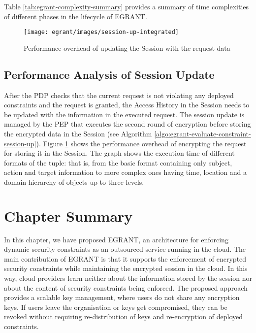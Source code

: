 \documentclass[epsfig,a4paper,11pt,titlepage]{book}
\numberwithin{algorithm}{chapter}
\begin{document}
Table \ref{tab:egrant-complexity-summary} provides a summary of time complexities of different phases in the lifecycle of \gls{EGRANT}.



\begin{figure} [htp]
\centering
\texttt{[image: egrant/images/session-up-integrated]}
\caption{Performance overhead of updating the Session with the request data}
\label{fig:egrant-session-up-integrated}
\end{figure}

\subsection{Performance Analysis of Session Update}
After the \gls{PDP} checks that the current request is not violating any deployed constraints and the request is granted, the Access History in the Session needs to be updated with the information in the executed request. The session update is managed by the \gls{PEP} that executes the second round of encryption before storing the encrypted data in the Session (see Algorithm \ref{algo:egrant-evaluate-constraint-session-up}). Figure \ref{fig:egrant-session-up-integrated} shows the performance overhead of encrypting the request for storing it in the Session. The graph shows the execution time of different formats of the  tuple: that is, from the basic format containing only subject, action and target information to more complex ones having time, location and a domain hierarchy of objects up to three levels.


\section{Chapter Summary}
\label{sec:egrant-summary}

In this chapter, we have proposed \gls{EGRANT}, an architecture for enforcing dynamic security constraints as an outsourced service running in the cloud. The main contribution of \gls{EGRANT} is that it supports the enforcement of encrypted security constraints while maintaining the encrypted session in the cloud. In this way, cloud providers learn neither about the information stored by the session nor about the content of security constraints being enforced. The proposed approach provides a scalable key management, where users do not share any encryption keys. If users leave the organisation or keys get compromised, they can be revoked without requiring re-distribution of keys and re-encryption of deployed constraints.
\end{document}
